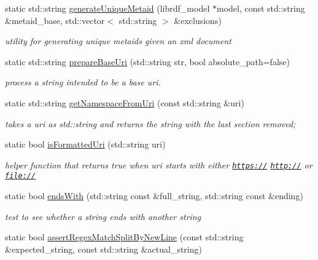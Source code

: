 \begin{DoxyCompactItemize}
static std\+::string \hyperlink{classomexmeta_1_1OmexMetaUtils_a4700231d455a5f65f7cc290d98d2b0ec}{generate\+Unique\+Metaid} (librdf\+\_\+model $\ast$model, const std\+::string \&metaid\+\_\+base, std\+::vector$<$ std\+::string $>$ \&exclusions)
\begin{DoxyCompactList}\small\item\em utility for generating unique metaids given an xml document \end{DoxyCompactList}\item 
static std\+::string \hyperlink{classomexmeta_1_1OmexMetaUtils_a6694715cf3f5dccd33d416ecc84ff375}{prepare\+Base\+Uri} (std\+::string str, bool absolute\+\_\+path=false)
\begin{DoxyCompactList}\small\item\em process a string intended to be a base uri. \end{DoxyCompactList}\item 
static std\+::string \hyperlink{classomexmeta_1_1OmexMetaUtils_a0956bde073b212596d8e4b2ffc983e47}{get\+Namespace\+From\+Uri} (const std\+::string \&uri)
\begin{DoxyCompactList}\small\item\em takes a uri as std\+::string and returns the string with the last section removed; \end{DoxyCompactList}\item 
static bool \hyperlink{classomexmeta_1_1OmexMetaUtils_af663724f2efb0324a64c6a57e8491c13}{is\+Formatted\+Uri} (std\+::string uri)
\begin{DoxyCompactList}\small\item\em helper function that returns true when uri starts with either {\ttfamily \href{https://}{\tt https\+://}} {\ttfamily \href{http://}{\tt http\+://}} or {\ttfamily \href{file://}{\tt file\+://}} \end{DoxyCompactList}\item 
static bool \hyperlink{classomexmeta_1_1OmexMetaUtils_a9c2b712b85f74fff9740477660f7b371}{ends\+With} (std\+::string const \&full\+\_\+string, std\+::string const \&ending)
\begin{DoxyCompactList}\small\item\em test to see whether a string ends with another string \end{DoxyCompactList}\item 
\mbox{\label{classomexmeta_1_1OmexMetaUtils_a4ec81c80bf33d232331ea9ef0b94da61}} 
static bool \hyperlink{classomexmeta_1_1OmexMetaUtils_a4ec81c80bf33d232331ea9ef0b94da61}{assert\+Regex\+Match\+Split\+By\+New\+Line} (const std\+::string \&expected\+\_\+string, const std\+::string \&actual\+\_\+string)

\end{DoxyCompactItemize}
